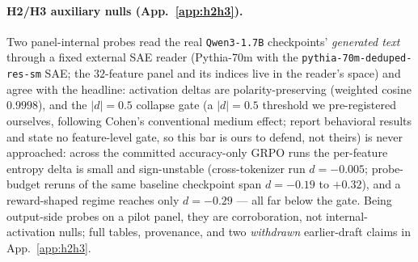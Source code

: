 \documentclass{article}
\begin{document}
\paragraph{H2/H3 auxiliary nulls (App.~\ref{app:h2h3}).}
Two panel-internal probes read the real \texttt{Qwen3-1.7B} checkpoints' \emph{generated text} through a fixed external SAE reader (Pythia-70m with the \texttt{pythia-70m-deduped-res-sm} SAE; the $32$-feature panel and its indices live in the reader's space) and agree with the headline: activation deltas are polarity-preserving (weighted cosine $0.9998$), and the $|d|{=}0.5$ collapse gate (a $|d|=0.5$ threshold we pre-registered ourselves, following Cohen's conventional medium effect; \citet{yue2025,wang2025} report behavioral results and state no feature-level gate, so this bar is ours to defend, not theirs) is never approached: across the committed accuracy-only GRPO runs the per-feature entropy delta is small and sign-unstable (cross-tokenizer run $d=-0.005$; probe-budget reruns of the same baseline checkpoint span $d=-0.19$ to $+0.32$), and a reward-shaped regime reaches only $d=-0.29$ --- all far below the gate. Being output-side probes on a pilot panel, they are corroboration, not internal-activation nulls; full tables, provenance, and two \emph{withdrawn} earlier-draft claims in App.~\ref{app:h2h3}.
\end{document}
